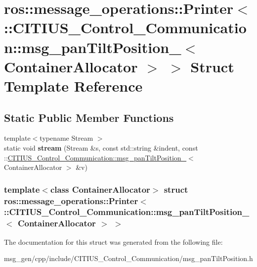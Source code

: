 \hypertarget{structros_1_1message__operations_1_1_printer_3_01_1_1_c_i_t_i_u_s___control___communication_1_1m8e05e58a2b49c7878ec296109a4698c8}{\section{ros\-:\-:message\-\_\-operations\-:\-:\-Printer$<$ \-:\-:\-C\-I\-T\-I\-U\-S\-\_\-\-Control\-\_\-\-Communication\-:\-:msg\-\_\-pan\-Tilt\-Position\-\_\-$<$ \-Container\-Allocator $>$ $>$ \-Struct \-Template \-Reference}
\label{structros_1_1message__operations_1_1_printer_3_01_1_1_c_i_t_i_u_s___control___communication_1_1m8e05e58a2b49c7878ec296109a4698c8}
}
\subsection*{\-Static \-Public \-Member \-Functions}
\begin{DoxyCompactItemize}
\item 
\hypertarget{structros_1_1message__operations_1_1_printer_3_01_1_1_c_i_t_i_u_s___control___communication_1_1m8e05e58a2b49c7878ec296109a4698c8_a993bb63db31ff66a90bc66f0b4a723d9}{{\footnotesize template$<$typename Stream $>$ }\\static void {\bfseries stream} (\-Stream \&s, const std\-::string \&indent, const \-::\hyperlink{struct_c_i_t_i_u_s___control___communication_1_1msg__pan_tilt_position__}{\-C\-I\-T\-I\-U\-S\-\_\-\-Control\-\_\-\-Communication\-::msg\-\_\-pan\-Tilt\-Position\-\_\-}$<$ \-Container\-Allocator $>$ \&v)}\label{structros_1_1message__operations_1_1_printer_3_01_1_1_c_i_t_i_u_s___control___communication_1_1m8e05e58a2b49c7878ec296109a4698c8_a993bb63db31ff66a90bc66f0b4a723d9}

\end{DoxyCompactItemize}
\subsubsection*{template$<$class Container\-Allocator$>$ struct ros\-::message\-\_\-operations\-::\-Printer$<$ \-::\-C\-I\-T\-I\-U\-S\-\_\-\-Control\-\_\-\-Communication\-::msg\-\_\-pan\-Tilt\-Position\-\_\-$<$ Container\-Allocator $>$ $>$}



\-The documentation for this struct was generated from the following file\-:\begin{DoxyCompactItemize}
\item 
msg\-\_\-gen/cpp/include/\-C\-I\-T\-I\-U\-S\-\_\-\-Control\-\_\-\-Communication/msg\-\_\-pan\-Tilt\-Position.\-h\end{DoxyCompactItemize}
